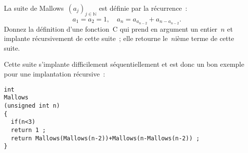 La suite  de Mallows~$(a_{j})_{j\in\mathbb{N}}$  est d\'efinie par  la
r\'ecurrence~:
\[
a_{1}=a_{2}=1,\quad
a_{n}=a_{a_{n-2}}+a_{n-a_{n-2}}.
\]
Donnez la d\'efinition d'une fonction~C qui prend en argument un
entier~$n$ et implante r\'ecursivement de cette suite~; elle retourne
le~$n$i\`eme terme de cette suite.
\ifcorrection%
\begin{correction}
Cette suite s'implante difficilement s\'equentiellement et est donc un bon exemple pour une
implantation r\'ecursive~:
\begin{verbatim}
int
Mallows
(unsigned int n)
{
  if(n<3)
  return 1 ;
  return Mallows(Mallows(n-2))+Mallows(n-Mallows(n-2)) ;
}
\end{verbatim}
\end{correction}
\fi%